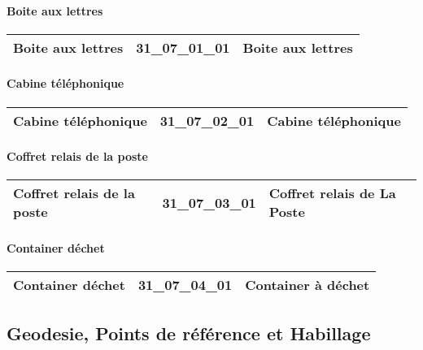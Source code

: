 \documentclass[12pt,titlepage,oneside]{book}
\begin{document}
\paragraph{Boite aux lettres}
\noindent
\vspace{\baselineskip}

\renewcommand{\arraystretch}{1.2}
\begin{supertabular}{|p{10cm}|c|p{15cm}|}
 Boite aux lettres & 31\_07\_01\_01 & Boite aux lettres\\
\hline
\end{supertabular}


\paragraph{Cabine téléphonique}
\noindent
\vspace{\baselineskip}

\renewcommand{\arraystretch}{1.2}
\begin{supertabular}{|p{10cm}|c|p{15cm}|}
 Cabine téléphonique & 31\_07\_02\_01 & Cabine téléphonique\\
\hline
\end{supertabular}


\paragraph{Coffret relais de la poste}
\noindent
\vspace{\baselineskip}

\renewcommand{\arraystretch}{1.2}
\begin{supertabular}{|p{10cm}|c|p{15cm}|}
 Coffret relais de la poste & 31\_07\_03\_01 & Coffret relais de La Poste\\
\hline
\end{supertabular}


\paragraph{Container déchet}
\noindent
\vspace{\baselineskip}

\renewcommand{\arraystretch}{1.2}
\begin{supertabular}{|p{10cm}|c|p{15cm}|}
 Container déchet & 31\_07\_04\_01 & Container à déchet\\
\hline
\end{supertabular}
\subsection{Geodesie, Points de référence et Habillage}
\end{document}
